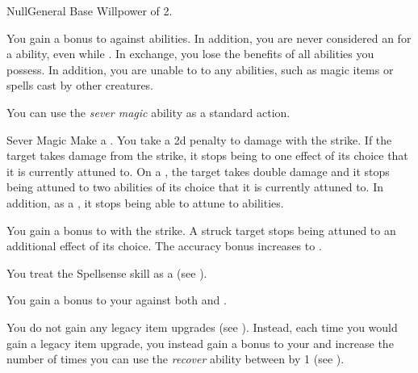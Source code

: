     \begin{feat}{Null}{General}
        \featpre Base Willpower of 2.

         You gain a  bonus to  against  abilities.
        In addition, you are never considered an  for a  ability, even while .
        In exchange, you lose the benefits of all  abilities you possess.
        In addition, you are unable to  to any  abilities, such as magic items or spells cast by other creatures.

         You can use the \textit{sever magic} ability as a standard action.
        \begin{freeability}{Sever Magic}
            Make a .
            You take a \minus2d penalty to damage with the strike.
            If the target takes damage from the strike, it stops being  to one effect of its choice that it is currently attuned to.
            On a , the target takes double damage and it stops being attuned to two abilities of its choice that it is currently attuned to.
            In addition, as a , it stops being able to attune to abilities.

            \rankline
             You gain a  bonus to  with the strike.
             A struck target stops being attuned to an additional effect of its choice.
             The accuracy bonus increases to .
        \end{freeability}

         You treat the Spellsense skill as a  (see ).

         You gain a  bonus to your  against both  and .

         You do not gain any legacy item upgrades (see ).
        Instead, each time you would gain a legacy item upgrade, you instead gain a  bonus to your  and increase the number of times you can use the \textit{recover} ability between  by 1 (see ).


\end{feat}
